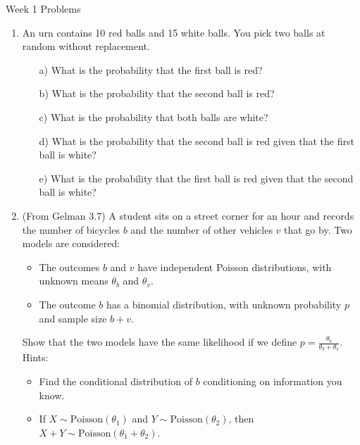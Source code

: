 \documentclass[10pt,a4paper]{article}
\author{Patrick Lam}
\begin{document}
\begin{center}
\begin{Large}Week 1 Problems\end{Large}
\end{center}
\bigskip
\begin{enumerate}

\item An urn contains 10 red balls and 15 white balls. You pick two balls at random without replacement.
\begin{enumerate}
\item[a)] What is the probability that the first ball is red?
\item[b)] What is the probability that the second ball is red?
\item[c)] What is the probability that both balls are white?
\item[d)] What is the probability that the second ball is red given that the first ball is white?
\item[e)] What is the probability that the first ball is red given that the second ball is white?
\end{enumerate}

\bigskip

\item (From Gelman 3.7) A student sits on a street corner for an hour and records the number of bicycles $b$ and the number of other vehicles $v$ that go by.  Two models are considered:
\begin{itemize}
\item The outcomes $b$ and $v$ have independent Poisson distributions, with unknown means $\theta_b$ and $\theta_v$.
\item The outcome $b$ has a binomial distribution, with unknown probability $p$ and sample size $b + v$.
\end{itemize}
Show that the two models have the same likelihood if we define $p = \frac{\theta_b}{\theta_b + \theta_v}$. \\

Hints:
\begin{itemize}
\item Find the conditional distribution of $b$ conditioning on information you know.
\item If $X \sim \mathrm{Poisson}(\theta_1)$ and $Y \sim \mathrm{Poisson}(\theta_2)$, then $X+Y \sim \mathrm{Poisson}(\theta_1 + \theta_2)$.
\end{itemize}

\bigskip 


\end{enumerate}
\end{document}
